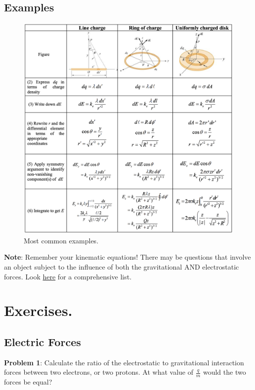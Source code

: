 \documentclass[11pt, letterpaper]{article}
\begin{document}
	\subsection{Examples}
	\begin{figure}[h!]
		\centering
		\includegraphics[scale=0.7]{charge-density}
		\caption{Most common examples.}
		\label{fig:examples}
	\end{figure}
	
	\noindent\textbf{Note}: Remember your kinematic equations! There may be questions that
	involve an object subject to the influence of both the gravitational AND electrostatic forces.
	Look \href{https://en.wikipedia.org/wiki/List_of_equations_in_classical_mechanics}{here} for
	a comprehensive list.
	\newpage
\setlength{\parindent}{0.0cm}
\section{Exercises.}
\subsection{Electric Forces}
\textbf{Problem 1}: Calculate the ratio of the electrostatic to gravitational interaction forces 
between two electrons, or two protons. At what value of $\frac{q}{m}$ would the two forces
be equal?
\end{document}
